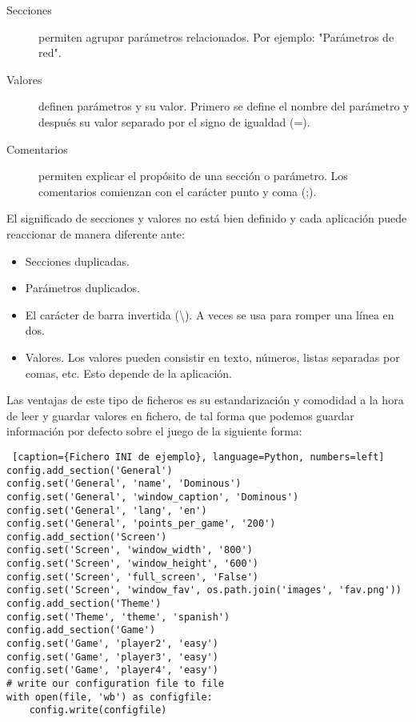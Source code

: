 \begin{description}
    \item[Secciones] permiten agrupar parámetros relacionados. Por ejemplo: "Parámetros de red".
    \item[Valores] definen parámetros y su valor. Primero se define el nombre del parámetro y después su valor separado por
            el signo de igualdad (=).
    \item[Comentarios] permiten explicar el propósito de una sección o parámetro. Los comentarios comienzan con el carácter
            punto y coma (;).
\end{description}

El significado de secciones y valores no está bien definido y cada aplicación puede reaccionar de manera diferente ante:

\begin{itemize}
    \item Secciones duplicadas.
    \item Parámetros duplicados.
    \item El carácter de barra invertida (\textbackslash). A veces se usa para romper una línea en dos.
    \item Valores. Los valores pueden consistir en texto, números, listas separadas por comas, etc. Esto depende de la aplicación.
\end{itemize}

Las ventajas de este tipo de ficheros es su estandarización y comodidad a la hora de leer y guardar valores en fichero,
de tal forma que podemos guardar información por defecto sobre el juego de la siguiente forma:

\begin{lstlisting} [caption={Fichero INI de ejemplo}, language=Python, numbers=left]
config.add_section('General')
config.set('General', 'name', 'Dominous')
config.set('General', 'window_caption', 'Dominous')
config.set('General', 'lang', 'en')
config.set('General', 'points_per_game', '200')
config.add_section('Screen')
config.set('Screen', 'window_width', '800')
config.set('Screen', 'window_height', '600')
config.set('Screen', 'full_screen', 'False')
config.set('Screen', 'window_fav', os.path.join('images', 'fav.png'))
config.add_section('Theme')
config.set('Theme', 'theme', 'spanish')
config.add_section('Game')
config.set('Game', 'player2', 'easy')
config.set('Game', 'player3', 'easy')
config.set('Game', 'player4', 'easy')
# write our configuration file to file
with open(file, 'wb') as configfile:
    config.write(configfile)
\end{lstlisting}

